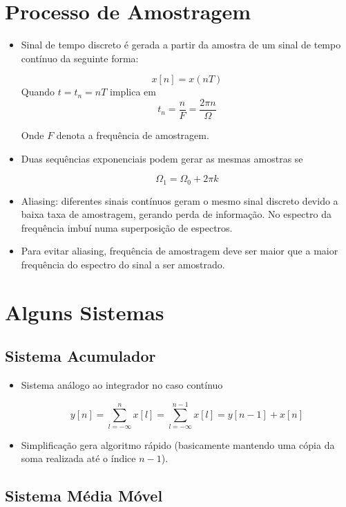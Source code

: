 \section{Processo de Amostragem}
\begin{itemize}
    \item Sinal de tempo discreto é gerada a partir da amostra de um sinal de tempo contínuo da seguinte forma:
    
    \[x[n] = x(nT)\]
    Quando $t = t_{n} = nT$ implica em
    \[t_{n} = \dfrac{n}{F} = \dfrac{2\pi n}{\Omega}\]

    Onde $F$ denota a frequência de amostragem.

    \item Duas sequências exponenciais podem gerar as mesmas amostras se 
    
    \[\Omega_{1} = \Omega_{0} + 2\pi k\]

    \item Aliasing: diferentes sinais contínuos geram o mesmo sinal discreto devido a baixa taxa de amostragem, gerando perda de informação. No espectro da frequência imbuí numa superposição de espectros.
    \item Para evitar aliasing, frequência de amostragem deve ser maior que a maior frequência do espectro do sinal a ser amostrado.
\end{itemize}


\section{Alguns Sistemas}
\subsection{Sistema Acumulador}


\begin{itemize}
    \item Sistema análogo ao integrador no caso contínuo

    \[y[n] = \sum^{n}_{l = -\infty} x[l] = \sum^{n - 1}_{l = -\infty} x[l] = y[n - 1] + x[n]\]

    \item Simplificação gera algoritmo rápido (basicamente mantendo uma cópia da soma realizada até o índice $n - 1$).
    
\end{itemize}

\subsection{Sistema Média Móvel}


